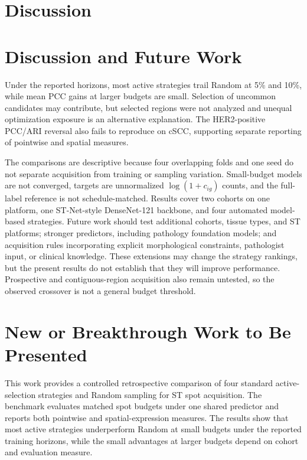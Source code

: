\documentclass[]{spie}
\begin{document}
\section{Discussion}
\section{Discussion and Future Work}
\label{sec:discussion}

Under the reported horizons, most active strategies trail Random at 5\% and 10\%, while mean PCC gains at larger budgets are small. Selection of uncommon candidates may contribute, but selected regions were not analyzed and unequal optimization exposure is an alternative explanation. The HER2-positive PCC/ARI reversal also fails to reproduce on cSCC, supporting separate reporting of pointwise and spatial measures.

The comparisons are descriptive because four overlapping folds and one seed do not separate acquisition from training or sampling variation. Small-budget models are not converged, targets are unnormalized $\log(1+c_{ig})$ counts, and the full-label reference is not schedule-matched. Results cover two cohorts on one platform, one ST-Net-style DenseNet-121 backbone, and four automated model-based strategies. Future work should test additional cohorts, tissue types, and ST platforms; stronger predictors, including pathology foundation models; and acquisition rules incorporating explicit morphological constraints, pathologist input, or clinical knowledge. These extensions may change the strategy rankings, but the present results do not establish that they will improve performance. Prospective and contiguous-region acquisition also remain untested, so the observed crossover is not a general budget threshold.

\section{New or Breakthrough Work to Be Presented}

This work provides a controlled retrospective comparison of four standard active-selection strategies and Random sampling for ST spot acquisition. The benchmark evaluates matched spot budgets under one shared predictor and reports both pointwise and spatial-expression measures. The results show that most active strategies underperform Random at small budgets under the reported training horizons, while the small advantages at larger budgets depend on cohort and evaluation measure.
\end{document}
